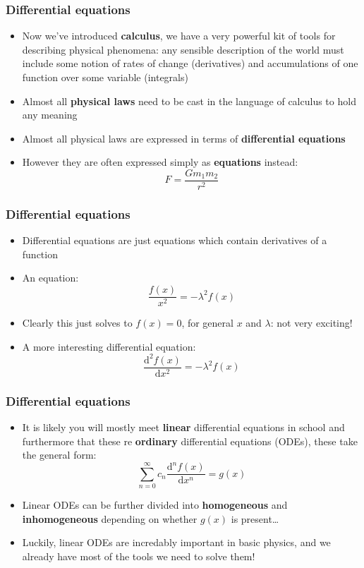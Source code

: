 \documentclass{beamer}
\begin{document}
\begin{frame}
  \frametitle{Differential equations}
  \begin{itemize}
    \item<1-> Now we've introduced \textbf{calculus}, we have a very powerful kit of tools for describing physical phenomena: any sensible description of the world must include some notion of rates of change (derivatives) and accumulations of one function over some variable (integrals)
    \item<2-> Almost all \textbf{physical laws} need to be cast in the language of calculus to hold any meaning
    \item<3-> Almost all physical laws are expressed in terms of \textbf{differential equations}
    \item<4-> However they are often expressed simply as \textbf{equations} instead:
      \begin{equation*}
	F=\frac{Gm_1m_2}{r^2}
      \end{equation*}
  \end{itemize}
\end{frame}

\begin{frame}
  \frametitle{Differential equations}
  \begin{itemize}
    \item<1-> Differential equations are just equations which contain derivatives of a function
    \item<2-> An equation:
      \begin{equation*}
	\frac{f(x)}{x^2}=-\lambda^2 f(x)
      \end{equation*}
    \item<3-> Clearly this just solves to $f(x)=0$, for general $x$ and $\lambda$: not very exciting!
    \item<4-> A more interesting differential equation:
      \begin{equation*}
	\frac{\mathrm{d}^2f(x)}{\mathrm{d}x^2}=-\lambda^2f(x)
      \end{equation*}
  \end{itemize}
\end{frame}

\begin{frame}
  \frametitle{Differential equations}
  \begin{itemize}
    \item<1-> It is likely you will mostly meet \textbf{linear} differential equations in school and furthermore that these re \textbf{ordinary} differential equations (ODEs), these take the general form:
      \begin{equation*}
	\sum_{n=0}^{\infty}c_n\frac{\mathrm{d}^nf(x)}{\mathrm{d}x^n}=g(x)
      \end{equation*}
    \item<2-> Linear ODEs can be further divided into \textbf{homogeneous} and \textbf{inhomogeneous} depending on whether $g(x)$ is present\ldots
    \item<3-> Luckily, linear ODEs are incredably important in basic physics, and we already have most of the tools we need to solve them!
  \end{itemize}
\end{frame}
\end{document}
